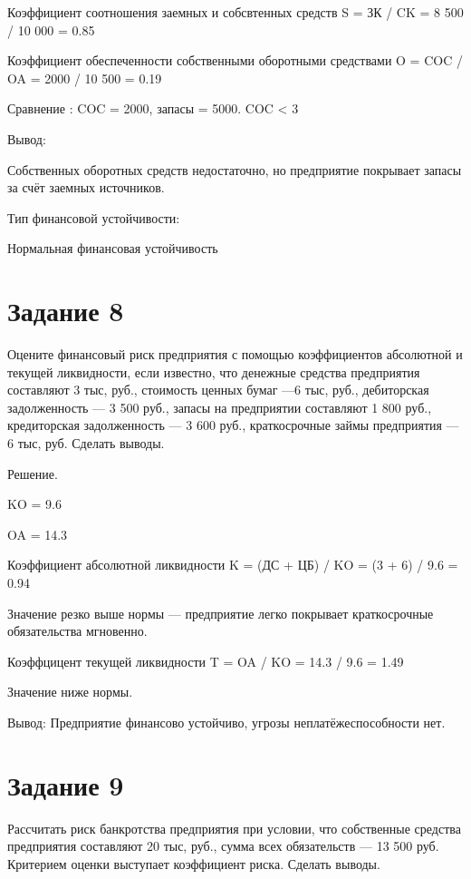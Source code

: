 \documentclass[14pt,a4paper]{extarticle}
\begin{document}
Коэффициент соотношения заемных и собсвтенных средств S = ЗК / CK = 8 500 / 10 000 = 0.85

Коэффициент обеспеченности собственными оборотными средствами O = COC / OA = 2000 / 10 500 = 0.19

Сравнение :  COC = 2000, запасы = 5000. COC < 3

Вывод:

Собственных оборотных средств недостаточно, но предприятие покрывает запасы за счёт заемных источников.

Тип финансовой устойчивости:

Нормальная финансовая устойчивость


\section{Задание 8}
\begin{sloppypar}
Оцените финансовый риск предприятия с помощью коэффициентов абсолютной и
текущей ликвидности, если известно, что денежные средства предприятия составляют 3
тыс, руб., стоимость ценных бумаг —6 тыс, руб., дебиторская задолженность — 3 500
руб., запасы на предприятии составляют 1 800 руб., кредиторская задолженность — 3
600 руб., краткосрочные займы предприятия — 6 тыс, руб. Сделать выводы.
\end{sloppypar}

Решение.

KO = 9.6

OA = 14.3

Коэффициент абсолютной ликвидности K = (ДС + ЦБ) / KO = (3 + 6) / 9.6 = 0.94

Значение резко выше нормы — предприятие легко покрывает краткосрочные обязательства мгновенно.

Коэффцицент текущей ликвидности T = OA / KO = 14.3 / 9.6 = 1.49

Значение ниже нормы.

Вывод: Предприятие финансово устойчиво, угрозы неплатёжеспособности нет.



\section{Задание 9}
\begin{sloppypar}
Рассчитать риск банкротства предприятия при условии, что собственные средства
предприятия составляют 20 тыс, руб., сумма всех обязательств — 13 500 руб. Критерием
оценки выступает коэффициент риска. Сделать выводы.
\end{sloppypar}
\end{document}
